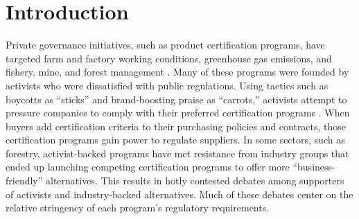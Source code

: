 \documentclass[
      12pt,
            Review ]{article}
\author{}
\date{\today}
\begin{document}
 














\noindent 
      \doublespacing 
    \section{Introduction}\label{introduction}

Private governance initiatives, such as product certification programs,
have targeted farm and factory working conditions, greenhouse gas
emissions, and fishery, mine, and forest management
\citep{Auld2014, Bartley2003, Bozzi2012, Hudson2003, VanderVen2015, Vince2017}.
Many of these programs were founded by activists who were dissatisfied
with public regulations. Using tactics such as boycotts as ``sticks''
and brand-boosting praise as ``carrots,'' activists attempt to pressure
companies to comply with their preferred certification programs
\citep{Cashore2002}. When buyers add certification criteria to their
purchasing policies and contracts, those certification programs gain
power to regulate suppliers. In some sectors, such as forestry,
activist-backed programs have met resistance from industry groups that
ended up launching competing certification programs to offer more
``business-friendly'' alternatives. This results in hotly contested
debates among supporters of activists and industry-backed alternatives.
Much of these debates center on the relative stringency of each
program's regulatory requirements.
\end{document}
